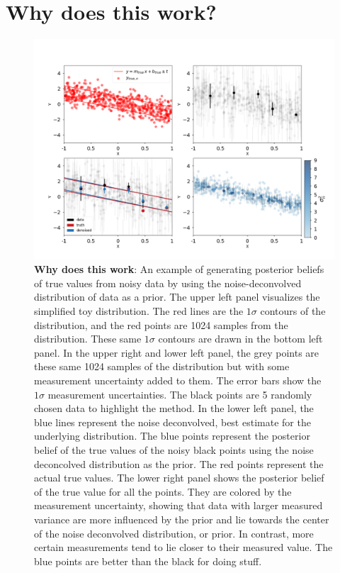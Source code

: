 \documentclass[modern]{aastex61}
\begin{document}
\section{Why does this work?}
\begin{figure}
\centering
  \includegraphics[width=\textwidth]{toy.png}
\caption{ {\bf Why does this work}: An example of generating posterior beliefs of true values from noisy data by using the noise-deconvolved distribution of data as a prior. The upper left panel visualizes the simplified toy distribution. The red lines are the $1\sigma$ contours of the distribution, and the red points are 1024 samples from the distribution. These same $1\sigma$ contours are drawn in the bottom left panel. In the upper right and lower left panel, the grey points are these same 1024 samples of the distribution but with some measurement uncertainty added to them. The error bars show the $1\sigma$ measurement uncertainties. The black points are 5 randomly chosen data to highlight the method. In the lower left panel, the blue lines represent the noise deconvolved, best estimate for the underlying distribution. The blue points represent the posterior belief of the true values of the noisy black points using the noise deconcolved distribution as the prior. The red points represent the actual true values. The lower right panel shows the posterior belief of the true value for all the points. They are colored by the measurement uncertainty, showing that data with larger measured variance are more influenced by the prior and lie towards the center of the noise deconvolved distribution, or prior. In contrast, more certain measurements tend to lie closer to their measured value. The blue points are better than the black for doing stuff.}
\label{fig:toy}
\end{figure}
\end{document}
